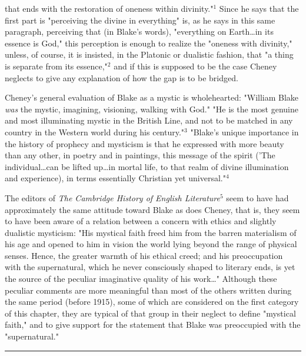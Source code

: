 \noindent that ends with the restoration of oneness within divinity."$^{1}$ Since he says that the 
first part is "perceiving the divine in everything" is, as he says in this same paragraph, perceiving
that (in Blake's words), "everything on Earth\dots in its essence is God," this perception is enough to
realize the "oneness with divinity," unless, of course, it is insisted, in the Platonic or dualistic fashion, that
"a thing is separate from its essence,"$^{2}$ and if this is supposed to be the case Cheney neglects to give any explanation
of how the gap is to be bridged.\par
\vspace*{0.5\baselineskip}
Cheney's general evaluation of Blake as a mystic is wholehearted: "William Blake \textit{was} the mystic, imagining, visioning,
walking with God." "He is the most genuine and most illuminating mystic in the British Line, and not to be
matched in any country in the Western world during his century."$^{3}$ "Blake's unique  importance in the history of
prophecy and mysticism is that he expressed with more beauty than any other, in poetry and in paintings, this message of the spirit
('The individual\dots can be lifted up\dots in mortal life, to that realm of divine illumination and experience), in terms essentially
Christian yet universal."$^{4}$\par
\vspace*{0.5\baselineskip}
The editors of \textit{The Cambridge History of English Literature}$^{5}$ seem to have had approximately the same attitude toward
Blake as does Cheney, that is, they seem to have been aware of a relation between a concern with ethics and 
slightly dualistic mysticism: "His mystical faith freed him from the barren materialism of his age and opened to him in
vision the world lying beyond the range of physical senses. Hence, the greater warmth of his ethical creed; and his
preoccupation with the supernatural, which he never consciously shaped to literary ends, is yet the source of the peculiar
imaginative quality of his work\dots" Although these peculiar comments are more meaningful than most of the others written
during the same period (before 1915), some of which are considered on the first category of this chapter, they are
typical of that group in their neglect to define "mystical faith," and to give support for the statement that Blake was 
preoccupied with the "supernatural."\par
\vspace*{\fill}
\noindent\rule{0.25\textwidth}{0.4pt}\par
